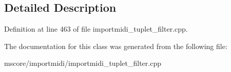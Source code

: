 \subsection{Detailed Description}


Definition at line 463 of file importmidi\+\_\+tuplet\+\_\+filter.\+cpp.



The documentation for this class was generated from the following file\+:\begin{DoxyCompactItemize}
\item 
mscore/importmidi/importmidi\+\_\+tuplet\+\_\+filter.\+cpp\end{DoxyCompactItemize}
